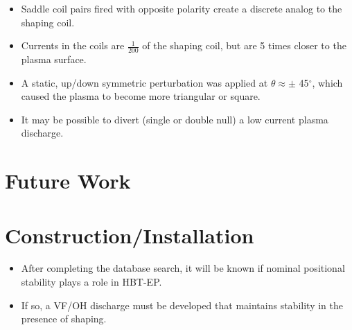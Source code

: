 \documentclass{article}
\begin{document}
\begin{multicols}{5}
\begin{itemize}
\item Saddle coil pairs fired with opposite polarity create a discrete analog to the shaping coil.
\item Currents in the coils are $\frac{1}{200}$ of the shaping coil, but are 5 times closer to the plasma surface.
\item A static, up/down symmetric perturbation was applied at $\theta \approx \pm$ 45$^{\circ}$, which caused the plasma to become more triangular or square.
\item It may be possible to divert (single or double null) a low current plasma discharge.



\end{itemize}

\section{Future Work}

\section*{Construction/Installation}
\begin{itemize}
\item After completing the database search, it will be known if nominal positional stability plays a role in HBT-EP.
\item If so, a VF/OH discharge must be developed that maintains stability in the presence of shaping.


\end{itemize}
\end{multicols}
\end{document}
